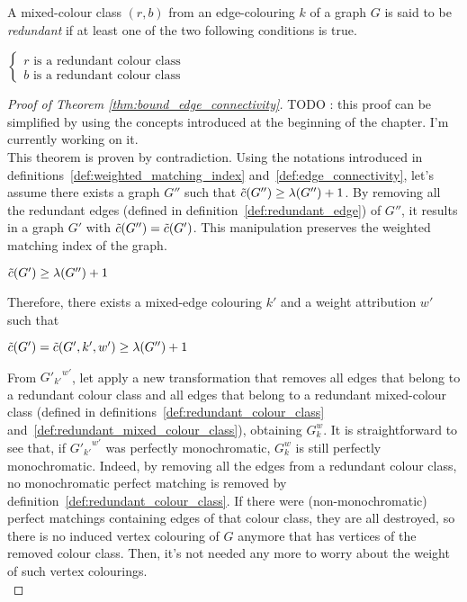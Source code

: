 \begin{definition}
    \label{def:redundant_mixed_colour_class}
    A mixed-colour class $(r, b)$ from an edge-colouring $k$ of a graph $G$ is said to be \textit{redundant} if at least one of the two following conditions is true.
    \begin{center}
        $\left\{
        \begin{array}{l}
            r \mbox{ is a redundant colour class} \\
            b \mbox{ is a redundant colour class}
        \end{array}
        \right.$
    \end{center}
\end{definition}

\begin{proof}[Proof of Theorem \ref{thm:bound_edge_connectivity}]
    TODO : this proof can be simplified by using the concepts introduced at the beginning of the chapter.
    I'm currently working on it.\\

    This theorem is proven by contradiction.
    Using the notations introduced in definitions~\ref{def:weighted_matching_index} and~\ref{def:edge_connectivity}, let's assume there exists a graph $G''$ such that $\Tilde{c}(G'') \geq \lambda(G'') + 1$.
    By removing all the redundant edges (defined in definition~\ref{def:redundant_edge}) of $G''$, it results in a graph $G'$ with $\Tilde{c}(G'') = \Tilde{c}(G')$.
    This manipulation preserves the weighted matching index of the graph.
    
    \begin{center}
        $\Tilde{c}(G') \geq \lambda(G'') + 1$
    \end{center}
    
    Therefore, there exists a mixed-edge colouring $k'$ and a weight attribution $w'$ such that
    
    \begin{center}
        $\Tilde{c}(G') = \Tilde{c}(G', k', w') \geq \lambda(G'') + 1$
    \end{center}
    
    From ${G'_{k'}}^{w'}$, let apply a new transformation that removes all edges that belong to a redundant colour class and all edges that belong to a redundant mixed-colour class (defined in definitions~\ref{def:redundant_colour_class} and~\ref{def:redundant_mixed_colour_class}), obtaining $G_k^w$.
    It is straightforward to see that, if ${G'_{k'}}^{w'}$ was perfectly monochromatic, $G_k^w$ is still perfectly monochromatic.
    Indeed, by removing all the edges from a redundant colour class, no monochromatic perfect matching is removed by definition~\ref{def:redundant_colour_class}.
    If there were (non-monochromatic) perfect matchings containing edges of that colour class, they are all destroyed, so there is no induced vertex colouring of $G$ anymore that has vertices of the removed colour class.
    Then, it's not needed any more to worry about the weight of such vertex colourings. \\
    

\end{proof}
